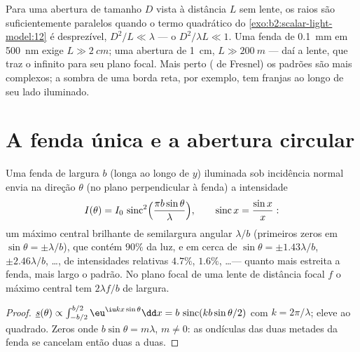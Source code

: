 \begin{remark}\label{rem:b2:diffraction:fresnelnumber}
Para uma abertura de tamanho $D$ vista à distância $L$ sem lente, os
raios são suficientemente paralelos quando o termo quadrático do
\cref{exo:b2:scalar-light-model:12} é desprezível, $D^2/L \ll \lambda$ ---
o \emph{} $D^2/\lambda L \ll 1$. Uma fenda de \qty{0.1}{mm} em
\qty{500}{nm} exige $L \gg \qty{2}{cm}$; uma abertura de \qty{1}{cm}, $L \gg \qty{200}{m}$ ---
daí a lente, que traz o infinito para seu plano focal. Mais perto
( de Fresnel) os padrões são mais complexos; a sombra de uma
borda reta, por exemplo, tem franjas ao longo de seu lado iluminado.
\end{remark}

\section{A fenda única e a abertura circular}

\begin{proposition}\label{prop:b2:diffraction:slit}
Uma fenda de largura $b$ (longa ao longo de $y$) iluminada sob incidência normal envia na
direção $\theta$ (no plano perpendicular à fenda) a
intensidade
\[
I(\theta) = I_0\,\operatorname{sinc}^2\Bigl(\frac{\pi b\sin\theta}\lambda\Bigr) , \qquad \operatorname{sinc}x = \frac{\sin x}x :
\]
um máximo central brilhante de semilargura angular $\lambda/b$ (primeiros zeros em
$\sin\theta = \pm\lambda/b$), que contém $90\%$ da luz, e 
em cerca de $\sin\theta = \pm1.43\lambda/b$, $\pm2.46\lambda/b$, \dots, de intensidades
relativas $4.7\%$, $1.6\%$, \dots --- quanto mais estreita a fenda, mais largo
o padrão. No plano focal de uma lente de distância focal $f$ o
máximo central tem $2\lambda f/b$ de largura.
\end{proposition}

\begin{proof}
$\underline s(\theta) \propto \int_{-b/2}^{b/2}\eu^{\iu kx\sin\theta}\dd x = b\,\operatorname{sinc}(kb\sin\theta/2)$
com $k = 2\pi/\lambda$; eleve ao quadrado. Zeros onde $b\sin\theta = m\lambda$, $m \ne 0$: as
ondículas das duas metades da fenda se cancelam então duas a duas.
\end{proof}

